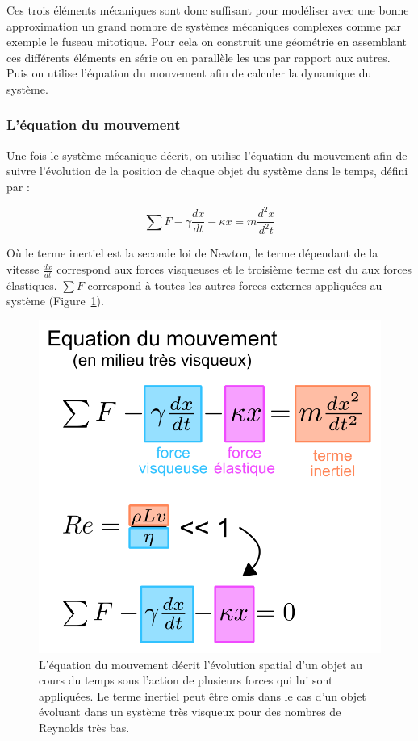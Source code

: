 \documentclass[12pt,a4paper,twoside,openright]{book}
\begin{document}
Ces trois éléments mécaniques sont donc suffisant pour modéliser avec
une bonne approximation un grand nombre de systèmes mécaniques complexes
comme par exemple le fuseau mitotique. Pour cela on construit une
géométrie en assemblant ces différents éléments en série ou en parallèle
les uns par rapport aux autres. Puis on utilise l'équation du mouvement
afin de calculer la dynamique du système.

\subsubsection{L'équation du mouvement}\label{luxe9quation-du-mouvement}

Une fois le système mécanique décrit, on utilise l'équation du mouvement
afin de suivre l'évolution de la position de chaque objet du système
dans le temps, défini par :

\[
\sum F - \gamma\frac{dx}{dt} - \kappa x = m\frac{d^2x}{d^2t}
\]

Où le terme inertiel est la seconde loi de Newton, le terme dépendant de
la vitesse \(\frac{dx}{dt}\) correspond aux forces visqueuses et le
troisième terme est du aux forces élastiques. \(\sum F\) correspond à
toutes les autres forces externes appliquées au système
(Figure~\ref{fig:motion_equation}).

\begin{figure}[htbp]
\centering
\includegraphics{figures/intro/motion_equation.png}
\caption[L'équation du mouvement]{\label{fig:motion_equation}L'équation
du mouvement décrit l'évolution spatial d'un objet au cours du temps
sous l'action de plusieurs forces qui lui sont appliquées. Le terme
inertiel peut être omis dans le cas d'un objet évoluant dans un système
très visqueux pour des nombres de Reynolds très bas.}
\end{figure}
\end{document}
